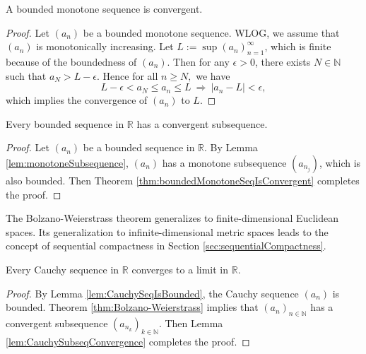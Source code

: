 \begin{thm}
  \label{thm:boundedMonotoneSeqIsConvergent}
  A bounded monotone sequence is convergent.
\end{thm}
\begin{proof}
  Let $(a_{n})$ be a bounded monotone sequence.
  WLOG, we assume that $(a_{n})$ is monotonically increasing.
  Let $L:=\sup(a_{n})_{n=1}^{\infty}$, which is finite because of
  the boundedness of $(a_{n})$.
  Then for any $\epsilon>0$, there exists $N\in \mathbb{N}$ such that
  $a_{N}>L-\epsilon$. Hence for all $n\ge N,$ we have
  \begin{displaymath}
    L-\epsilon<a_{N}\le a_{n}\le L\ \Rightarrow\ |a_{n}-L|<\epsilon,
  \end{displaymath}
  which implies the convergence of $(a_{n})$ to $L$.
\end{proof}

\begin{thm}
  \label{thm:Bolzano-Weierstrass}
  Every bounded sequence in $\mathbb{R}$
  has a convergent subsequence.
\end{thm}
\begin{proof}
  Let $(a_{n})$ be a bounded sequence in $\mathbb{R}$.
  By Lemma \ref{lem:monotoneSubsequence},
  $(a_{n})$ has a monotone subsequence $(a_{n_{j}})$,
  which is also bounded.
  Then Theorem \ref{thm:boundedMonotoneSeqIsConvergent}
  completes the proof.
\end{proof}

\begin{rem}
  The Bolzano-Weierstrass theorem generalizes
  to finite-dimensional Euclidean spaces.
  Its generalization to infinite-dimensional metric spaces
  leads to the concept of sequential compactness
  in Section \ref{sec:sequentialCompactness}. 
\end{rem}

\begin{thm}%
  \label{thm:realCauchySeqConverges}
  Every Cauchy sequence in $\mathbb{R}$
  converges to a limit in $\mathbb{R}$.
\end{thm}
\begin{proof}
  By Lemma \ref{lem:CauchySeqIsBounded},
  the Cauchy sequence $(a_n)$ is bounded.
  Theorem \ref{thm:Bolzano-Weierstrass}
  implies that $(a_n)_{n\in \mathbb{N}}$ has a convergent
  subsequence $(a_{n_k})_{k\in \mathbb{N}}$.
  Then Lemma \ref{lem:CauchySubseqConvergence}
  completes the proof.
\end{proof}

